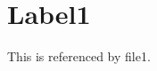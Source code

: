 \documentclass{article}
\begin{document}
\section{Label1}
\label{label1}
This is referenced by file1.
\end{document}
